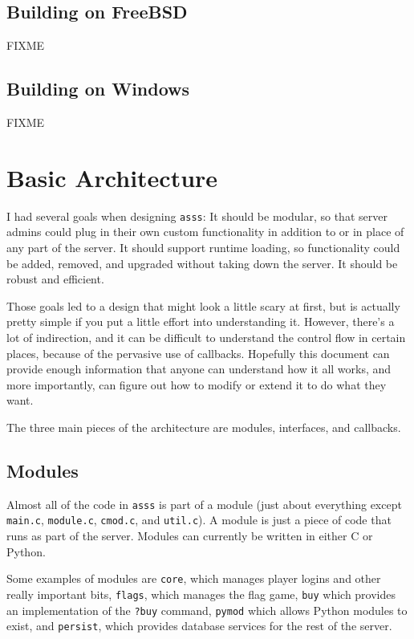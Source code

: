 \documentclass{article}
\newcommand{\asss}{\texttt{asss}}
\begin{document}
\subsection{Building on FreeBSD}

FIXME

\subsection{Building on Windows}

FIXME



\section{Basic Architecture}

I had several goals when designing \asss{}: It should be modular, so
that server admins could plug in their own custom functionality in
addition to or in place of any part of the server. It should support
runtime loading, so functionality could be added, removed, and upgraded
without taking down the server. It should be robust and efficient.

Those goals led to a design that might look a little scary at first, but
is actually pretty simple if you put a little effort into understanding
it. However, there's a lot of indirection, and it can be difficult to
understand the control flow in certain places, because of the pervasive
use of callbacks. Hopefully this document can provide enough information
that anyone can understand how it all works, and more importantly, can
figure out how to modify or extend it to do what they want.

The three main pieces of the architecture are modules, interfaces, and
callbacks.

\subsection{Modules}

Almost all of the code in \asss{} is part of a module (just about
everything except \verb/main.c/, \verb/module.c/, \verb/cmod.c/, and
\verb/util.c/). A module is just a piece of code that runs as part of
the server. Modules can currently be written in either C or Python.

Some examples of modules are \verb/core/, which manages player logins
and other really important bits, \verb/flags/, which manages the flag
game, \verb/buy/ which provides an implementation of the \verb/?buy/
command, \verb/pymod/ which allows Python modules to exist, and
\verb/persist/, which provides database services for the rest of the
server.
\end{document}
